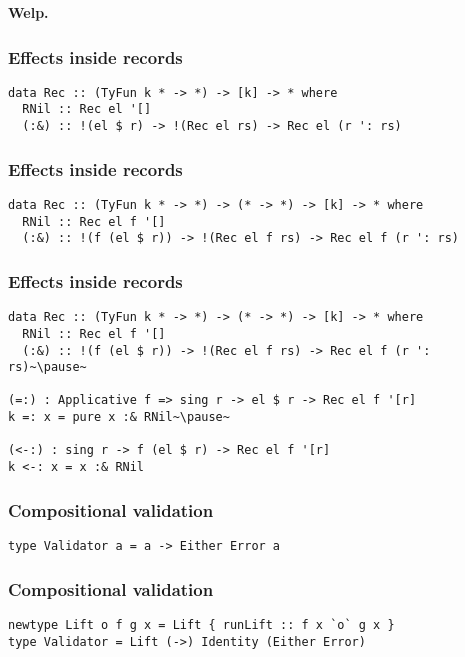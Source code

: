 \documentclass[tikz, 12pt]{beamer}
\begin{document}
\begin{frame}
  \centerline{\textbf{Welp.}}
\end{frame}

\begin{frame}[fragile]
  \frametitle{Effects inside records}
  \begin{lstlisting}
data Rec :: (TyFun k * -> *) -> [k] -> * where
  RNil :: Rec el '[]
  (:&) :: !(el $ r) -> !(Rec el rs) -> Rec el (r ': rs)
  \end{lstlisting}
\end{frame}

\begin{frame}[fragile]
  \frametitle{Effects inside records}
  \begin{lstlisting}
data Rec :: (TyFun k * -> *) -> (* -> *) -> [k] -> * where
  RNil :: Rec el f '[]
  (:&) :: !(f (el $ r)) -> !(Rec el f rs) -> Rec el f (r ': rs)
  \end{lstlisting}
\end{frame}

\begin{frame}[fragile]
  \frametitle{Effects inside records}
  \begin{lstlisting}
data Rec :: (TyFun k * -> *) -> (* -> *) -> [k] -> * where
  RNil :: Rec el f '[]
  (:&) :: !(f (el $ r)) -> !(Rec el f rs) -> Rec el f (r ': rs)~\pause~

(=:) : Applicative f => sing r -> el $ r -> Rec el f '[r]
k =: x = pure x :& RNil~\pause~

(<-:) : sing r -> f (el $ r) -> Rec el f '[r]
k <-: x = x :& RNil
  \end{lstlisting}
\end{frame}

\begin{frame}[fragile]
  \frametitle{Compositional validation}
  \begin{lstlisting}
type Validator a = a -> Either Error a
  \end{lstlisting}
\end{frame}

\begin{frame}[fragile]
  \frametitle{Compositional validation}
  \begin{lstlisting}
newtype Lift o f g x = Lift { runLift :: f x `o` g x }
type Validator = Lift (->) Identity (Either Error)
  \end{lstlisting}
\end{frame}
\end{document}

